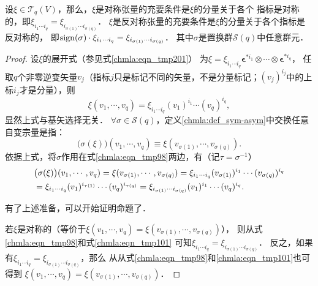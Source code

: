 \begin{proposition}\label{chmla:thm_component-sym-asym}
    设$\xi \in \mathcal{T}_q(V)$，那么，$\xi$是对称张量的充要条件是$\xi$的分量关于各个
    指标是对称的，即$\xi_{i_1\cdots i_q}=\xi_{i_{\sigma(1)}\cdots i_{\sigma(q)}}$．
    $\xi$是反对称张量的充要条件是$\xi$的分量关于各个指标是反对称的，
    即${\rm sign}(\sigma) \cdot \xi_{i_1\cdots i_q}= \xi_{i_{\sigma(1)}\cdots i_{\sigma(q)}}$．
    其中$\sigma$是置换群$\mathscr{S}(q)$中任意群元．
\end{proposition}
\begin{proof}
    设$\xi$的展开式（参见式\eqref{chmla:eqn_tmp201}）
    为$\xi = \xi_{i_1 \cdots i_q} \boldsymbol{\epsilon}^{*i_1} \otimes\cdots\otimes \boldsymbol{\epsilon}^{*i_q}$，
    任取$q$个非零逆变矢量$v_j$（指标$j$只是标记不同的矢量，不是分量标记；$(v_j)^{i_j}$中的上标$i_j$才是分量），则
    \begin{equation}\label{chmla:eqn_tmp98}
        \xi(v_1,\cdots,v_q)= \xi_{i_1 \cdots i_q} (v_1)^{i_1}\cdots (v_q)^{i_q},
    \end{equation}
    显然上式与基矢选择无关．
    $\forall \sigma \in \mathscr{S}(q)$，定义\ref{chmla:def_sym-asym}中交换任意自变宗量是指：
    \begin{equation}\label{chmla:eqn_tmp99}
        \bigl(\sigma(\xi)\bigr)(v_1,\cdots,v_q) \equiv
          \xi( v_{\sigma(1)},\cdots, v_{\sigma(q)}) .
    \end{equation}
    依据上式，将$\sigma$作用在式\eqref{chmla:eqn_tmp98}两边，有（记$\tau = \sigma^{-1}$）
    \begin{align}
        &\bigl(\sigma(\xi)\bigr)(v_1,\cdots,v_q)  =
        \xi( v_{\sigma(1)},\cdots, v_{\sigma(q)})
        =\xi_{i_1 \cdots i_q} (v_{\sigma(1)})^{i_1}\cdots (v_{\sigma(q)})^{i_q} \notag \\
       &=\xi_{i_1 \cdots i_q} (v_{1})^{i_{\tau(1)}}\cdots (v_{q})^{i_{\tau(q)}}
        =\xi_{i_{\sigma(1)} \cdots i_{\sigma(q)}} (v_{1})^{i_{1}}\cdots (v_{q})^{i_{q}} .
         \label{chmla:eqn_tmp101}
    \end{align}

    有了上述准备，可以开始证明命题了．

    若$\xi$是对称的（等价于$\xi(v_1,\cdots,v_q)=\xi( v_{\sigma(1)},\cdots, v_{\sigma(q)})$），
    则从式\eqref{chmla:eqn_tmp98}和式\eqref{chmla:eqn_tmp101}
    可知$\xi_{i_1 \cdots i_q}=\xi_{i_{\sigma(1)} \cdots i_{\sigma(q)}}$．
    反之，如果有$\xi_{i_1 \cdots i_q}=\xi_{i_{\sigma(1)} \cdots i_{\sigma(q)}}$，那么
    从从式\eqref{chmla:eqn_tmp98}和\eqref{chmla:eqn_tmp101}也可得到
    $\xi(v_1,\cdots,v_q)=\xi( v_{\sigma(1)},\cdots, v_{\sigma(q)})$．


\end{proof}
